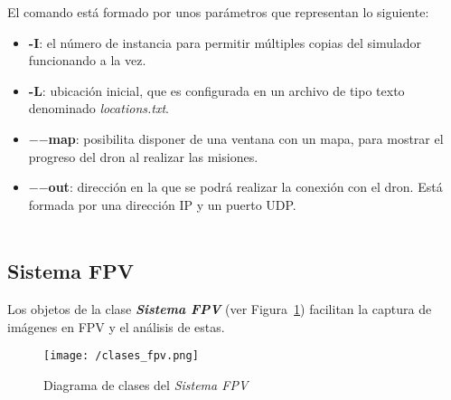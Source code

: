 
El comando está formado por unos parámetros que representan lo siguiente:
\begin{itemize}
\item \textbf{-I}: el número de instancia para permitir múltiples copias del simulador funcionando a la vez.
\item \textbf{-L}: ubicación inicial, que es configurada en un archivo de tipo texto denominado \textit{locations.txt}.
\item \textbf{$-$$-$map}: posibilita disponer de una ventana con un mapa, para mostrar el progreso del dron al realizar las misiones.
\item \textbf{$-$$-$out}: dirección en la que se podrá realizar la conexión con el dron. Está formada por una dirección IP y un puerto UDP. \\ \\
\end{itemize}

\subsection{Sistema \acs{FPV}}
\label{sec:sistemafpv}

Los objetos de la clase \textbf{\textit{Sistema \acs{FPV}}} (ver Figura~\ref{fig:diagclasesfpv}) facilitan la captura de imágenes en \acs{FPV} y el análisis de estas.

\begin{figure}[!h]
\begin{center}
\texttt{[image: /clases\_fpv.png]}
\caption[Diagrama de clases del \textit{Sistema \acs{FPV}}]{Diagrama de clases del \textit{Sistema \acs{FPV}}}
\label{fig:diagclasesfpv}
\end{center}
\end{figure}

